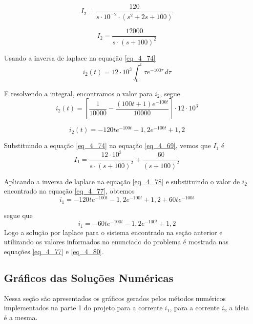 \documentclass[12pt]{article}
\begin{document}
\begin{equation}
    I_2 = \frac{120}{s\cdot10^{-2}\cdot(s^2+2s+100)}
\label{eq_4_73}
\end{equation}


\begin{equation}
    I_2 = \frac{12000}{s\cdot(s+100)^2}
\label{eq_4_74}
\end{equation}

Usando a inversa de laplace na equação \ref{eq_4_74}
\begin{equation}
  i_2(t) = 12\cdot10^3 \int_{0}^{t} \tau e^{-100\tau}\,d\tau
\label{eq_4_75}
\end{equation}



E resolvendo a integral, encontramos o valor para $i_2$, segue
\begin{equation}
  i_2(t) = [\frac{1}{10000} - \frac{(100t+1)e^{-100t}}{10000}]\cdot 12 \cdot 10^3
\label{eq_4_76}
\end{equation}




\begin{equation}
  i_2(t) = -120te^{-100t}-1,2e^{-100t}+1,2
\label{eq_4_77}
\end{equation}



Substituindo a equação \ref{eq_4_74} na equação \ref{eq_4_69}, vemos que $I_1$ é 
\begin{equation}
  I_1 = \frac{12 \cdot 10^3}{s \cdot(s+100)^2} + \frac{60}{(s+100)^2}
\label{eq_4_78}
\end{equation}




Aplicando a inversa de laplace na equação \ref{eq_4_78} e substituindo o valor de $i_2$ encontrado na equação \ref{eq_4_77}, obtemos
\begin{equation}
  i_1 = -120te^{-100t} - 1,2e^{-100t} + 1,2 + 60te^{-100t}
\label{eq_4_79}
\end{equation}




segue que
\begin{equation}
  i_1 = -60te^{-100t}-1,2e^{-100t} +1,2
\label{eq_4_80}
\end{equation}
Logo a solução por laplace para o sistema encontrado na seção anterior e utilizando os valores informados no enunciado do problema é mostrada nas equações \ref{eq_4_77} e \ref{eq_4_80}.




\subsection{Gráficos das Soluções Numéricas}
Nessa seção são apresentados os gráficos gerados pelos métodos numéricos implementados na parte 1 do projeto para a corrente $i_1$, para a corrente $i_2$ a ideia é a mesma. 
\end{document}
